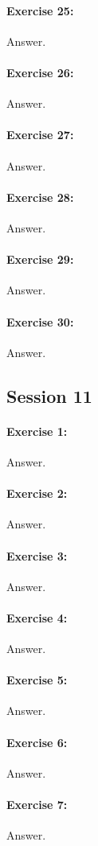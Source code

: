 \documentclass{article}
\begin{document}
\paragraph{Exercise 25:}
Answer.
\paragraph{Exercise 26:}
Answer.
\paragraph{Exercise 27:}
Answer.
\paragraph{Exercise 28:}
Answer.
\paragraph{Exercise 29:}
Answer.
\paragraph{Exercise 30:}
Answer.
\newpage

\subsection*{Session 11}
\paragraph{Exercise 1:}
Answer.
\paragraph{Exercise 2:}
Answer.
\paragraph{Exercise 3:}
Answer.
\paragraph{Exercise 4:}
Answer.
\paragraph{Exercise 5:}
Answer.
\paragraph{Exercise 6:}
Answer.
\paragraph{Exercise 7:}
Answer.
\end{document}

